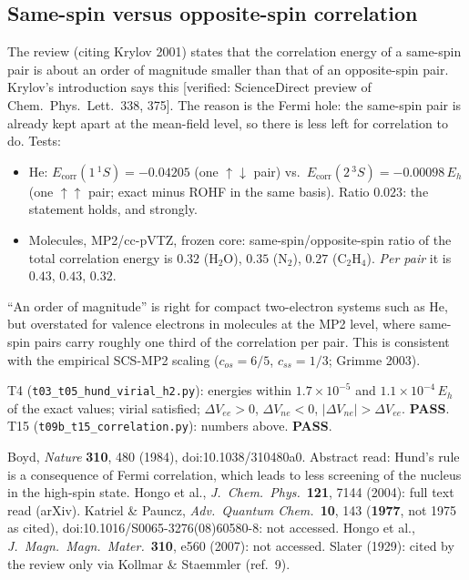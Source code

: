 \subsection{Same-spin versus opposite-spin correlation}
The review (citing Krylov 2001) states that the correlation energy of a same-spin pair is about an order
of magnitude smaller than that of an opposite-spin pair. Krylov's introduction says this
[verified: ScienceDirect preview of Chem.\ Phys.\ Lett.\ 338, 375]. The reason is the Fermi hole: the
same-spin pair is already kept apart at the mean-field level, so there is less left for correlation to do.
Tests:
\begin{itemize}
  \item He: $E_{\text{corr}}(1\,^1S)=-0.04205$ (one $\uparrow\downarrow$ pair) vs.\ $E_{\text{corr}}(2\,^3S)=-0.00098\,E_h$
        (one $\uparrow\uparrow$ pair; exact minus ROHF in the same basis). Ratio $0.023$: the statement holds,
        and strongly.
  \item Molecules, MP2/cc-pVTZ, frozen core: same-spin/opposite-spin ratio of the total correlation energy
        is $0.32$ (H$_2$O), $0.35$ (N$_2$), $0.27$ (C$_2$H$_4$). \emph{Per pair} it is $0.43$, $0.43$, $0.32$.
\end{itemize}
\begin{caveatbox}
``An order of magnitude'' is right for compact two-electron systems such as He, but overstated for
valence electrons in molecules at the MP2 level, where same-spin pairs carry roughly one third of the
correlation per pair. This is consistent with the empirical SCS-MP2 scaling ($c_{os}=6/5$, $c_{ss}=1/3$; Grimme 2003).
\end{caveatbox}

\begin{verifybox}
T4 (\texttt{t03\_t05\_hund\_virial\_h2.py}): energies within $1.7\times10^{-5}$ and $1.1\times10^{-4}\,E_h$ of the exact
values; virial satisfied; $\Delta V_{ee}>0$, $\Delta V_{ne}<0$, $|\Delta V_{ne}|>\Delta V_{ee}$. \textbf{PASS}.
T15 (\texttt{t09b\_t15\_correlation.py}): numbers above. \textbf{PASS}.
\end{verifybox}
\begin{sourcebox}
Boyd, \emph{Nature} \textbf{310}, 480 (1984), doi:10.1038/310480a0. Abstract read: Hund's rule is a
consequence of Fermi correlation, which leads to less screening of the nucleus in the high-spin state.
Hongo et al., \emph{J.\ Chem.\ Phys.}\ \textbf{121}, 7144 (2004): full text read (arXiv). Katriel \& Pauncz,
\emph{Adv.\ Quantum Chem.}\ \textbf{10}, 143 (\textbf{1977}, not 1975 as cited), doi:10.1016/S0065-3276(08)60580-8:
not accessed. Hongo et al., \emph{J.\ Magn.\ Magn.\ Mater.}\ \textbf{310}, e560 (2007): not accessed.
Slater (1929): cited by the review only via Kollmar \& Staemmler (ref.~9).
\end{sourcebox}
